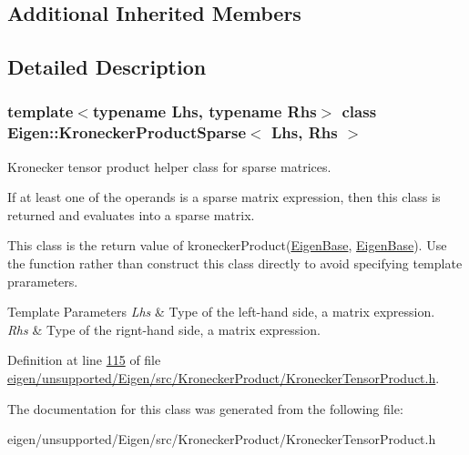 \subsection*{Additional Inherited Members}


\subsection{Detailed Description}
\subsubsection*{template$<$typename Lhs, typename Rhs$>$\newline
class Eigen\+::\+Kronecker\+Product\+Sparse$<$ Lhs, Rhs $>$}

Kronecker tensor product helper class for sparse matrices. 

If at least one of the operands is a sparse matrix expression, then this class is returned and evaluates into a sparse matrix.

This class is the return value of kronecker\+Product(\hyperlink{group___core___module_struct_eigen_1_1_eigen_base}{Eigen\+Base}, \hyperlink{group___core___module_struct_eigen_1_1_eigen_base}{Eigen\+Base}). Use the function rather than construct this class directly to avoid specifying template prarameters.


\begin{DoxyTemplParams}{Template Parameters}
{\em Lhs} & Type of the left-\/hand side, a matrix expression. \\
\hline
{\em Rhs} & Type of the rignt-\/hand side, a matrix expression. \\
\hline
\end{DoxyTemplParams}


Definition at line \hyperlink{eigen_2unsupported_2_eigen_2src_2_kronecker_product_2_kronecker_tensor_product_8h_source_l00115}{115} of file \hyperlink{eigen_2unsupported_2_eigen_2src_2_kronecker_product_2_kronecker_tensor_product_8h_source}{eigen/unsupported/\+Eigen/src/\+Kronecker\+Product/\+Kronecker\+Tensor\+Product.\+h}.



The documentation for this class was generated from the following file\+:\begin{DoxyCompactItemize}
\item 
eigen/unsupported/\+Eigen/src/\+Kronecker\+Product/\+Kronecker\+Tensor\+Product.\+h\end{DoxyCompactItemize}
